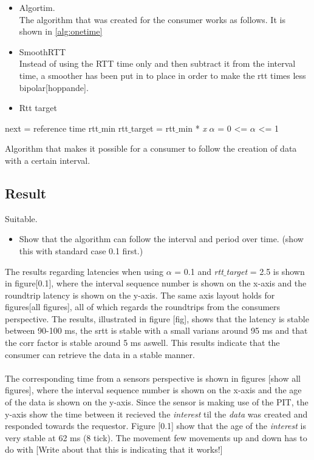 \begin{itemize}
\item Algortim. \\
The algorithm that was created for the consumer works as follows. 
It is shown in \ref{alg:onetime}
\item SmoothRTT \\
	Instead of using the RTT time only and then subtract it from the interval time, a smoother has been put in to place in order to make the rtt times less bipolar[hoppande].  
\item Rtt target
\end{itemize}


\begin{algorithm}[H]
 next = reference time\;
 rtt$\_$min\;
 rtt$\_$target = rtt$\_$min * \textit{x}\;
 $\alpha$ = 0 <= $\alpha$ <= 1\;
 \caption{Algorithm that makes it possible for a consumer to follow the creation of data with a certain interval.}
 \label{alg:onetime}
\end{algorithm}


\subsection{Result}
Suitable.

\begin{itemize}
\item Show that the algorithm can follow the interval and period over time. (show this with standard case 0.1 first.)\\
\end{itemize}
The results regarding latencies when using $\alpha$ = 0.1 and \textit{rtt$\_$target} = 2.5 is shown in figure[0.1], where the interval sequence number is shown on the x-axis and the roundtrip latency is shown on the y-axis. The same axis layout holds for figures[all figures], all of which regards the roundtrips from the consumers perspective. 
The results, illustrated in figure [fig], shows that the latency is stable between 90-100 ms, the srtt is stable with a small varians around 95 ms and that the corr factor is stable around 5 ms aswell. This results indicate that the consumer can retrieve the data in a stable manner.\\\\
The corresponding time from a sensors perspective is shown in figures [show all figures], where the interval sequence number is shown on the x-axis and the age of the data is shown on the y-axis. Since the sensor is making use of the PIT, the y-axis show the time between it recieved the \textit{interest} til the \textit{data} was created and responded towards the requestor. Figure [0.1] show that the age of the \textit{interest} is very stable at 62 ms (8 tick). The movement few movements up and down has to do with 
[Write about that this is indicating that it works!]



